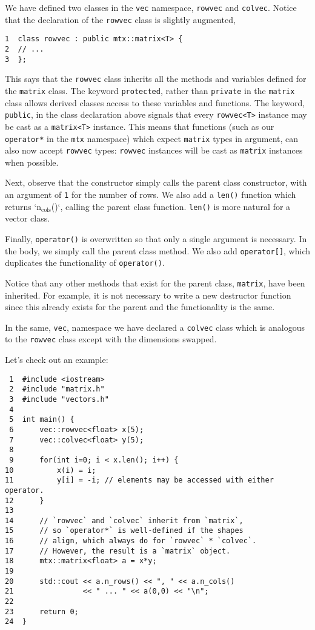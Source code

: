 \documentclass[11pt]{article}
\begin{document}
We have defined two classes in the \texttt{vec} namespace, \texttt{rowvec} and \texttt{colvec}.
Notice that the declaration of the \texttt{rowvec} class is slightly augmented,

\begin{verbatim}
1  class rowvec : public mtx::matrix<T> {
2  // ...
3  };
\end{verbatim}

This says that the \texttt{rowvec} class inherits all the methods and
variables defined for the \texttt{matrix} class. The keyword \texttt{protected}, 
rather than \texttt{private} in the \texttt{matrix} class allows derived classes 
access to these variables and functions. The keyword, \texttt{public}, in 
the class declaration above signals that every \texttt{rowvec<T>} instance 
may be cast as a \texttt{matrix<T>} instance. This means that functions (such
as our \texttt{operator*} in the \texttt{mtx} namespace) which expect \texttt{matrix} types
in argument, can also now accept \texttt{rowvec} types: \texttt{rowvec} instances 
will be cast as \texttt{matrix} instances when possible.


Next, observe that the constructor simply calls the parent class 
constructor, with an argument of \texttt{1} for the number of rows. We also 
add a \texttt{len()} function which returns `n\(_{\text{cols}}\)()`, calling the parent 
class function. \texttt{len()} is more natural for a vector class.

Finally, \texttt{operator()} is overwritten so that only a single argument is 
necessary. In the body, we simply call the parent class method. We also 
add \texttt{operator[]}, which duplicates the functionality of \texttt{operator()}.

Notice that any other methods that exist for the parent class, \texttt{matrix}, 
have been inherited. For example, it is not necessary to write a new 
destructor function since this already exists for the parent and the 
functionality is the same.

In the same, \texttt{vec}, namespace we have declared a \texttt{colvec} class which 
is analogous to the \texttt{rowvec} class except with the dimensions swapped.

Let's check out an example:

\begin{verbatim}
 1  #include <iostream>
 2  #include "matrix.h"
 3  #include "vectors.h"
 4  
 5  int main() {
 6      vec::rowvec<float> x(5);
 7      vec::colvec<float> y(5);
 8  
 9      for(int i=0; i < x.len(); i++) {
10          x(i) = i;
11          y[i] = -i; // elements may be accessed with either operator.
12      }
13  
14      // `rowvec` and `colvec` inherit from `matrix`,
15      // so `operator*` is well-defined if the shapes
16      // align, which always do for `rowvec` * `colvec`.
17      // However, the result is a `matrix` object.
18      mtx::matrix<float> a = x*y;
19  
20      std::cout << a.n_rows() << ", " << a.n_cols()
21                << " ... " << a(0,0) << "\n";
22  
23      return 0;
24  }
\end{verbatim}
\end{document}
